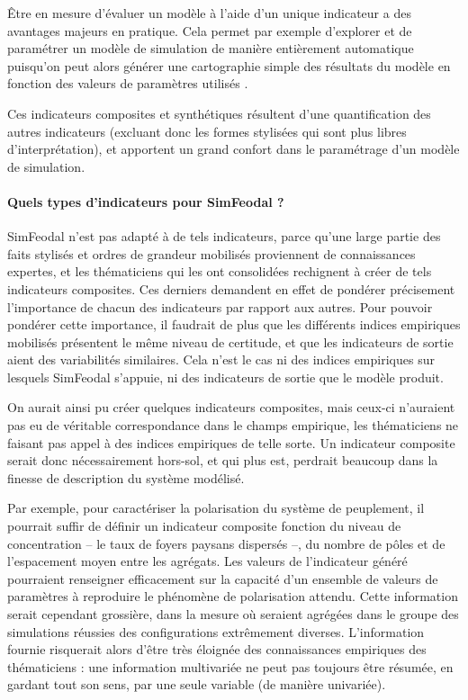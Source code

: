 Être en mesure d'évaluer un modèle à l'aide d'un unique indicateur a des avantages majeurs en pratique.
Cela permet par exemple d'explorer et de paramétrer un modèle de simulation de manière entièrement automatique puisqu'on peut alors générer une cartographie simple des résultats du modèle en fonction des valeurs de paramètres utilisés \autocite[voir][par exemple]{cherel_beyond_2015}.

Ces indicateurs composites et synthétiques résultent d'une quantification des autres indicateurs (excluant donc les formes stylisées qui sont plus libres d'interprétation), et apportent un grand confort dans le paramétrage d'un modèle de simulation.

\paragraph{Quels types d'indicateurs pour SimFeodal ?}\label{par:indicateurs-simfeodal}

SimFeodal n'est pas adapté à de tels indicateurs, parce qu'une large partie des faits stylisés et ordres de grandeur mobilisés proviennent de connaissances expertes, et les thématiciens qui les ont consolidées rechignent à créer de tels indicateurs composites.
Ces derniers demandent en effet de pondérer précisement l'importance de chacun des indicateurs par rapport aux autres.
Pour pouvoir pondérer cette importance, il faudrait de plus que les différents indices empiriques mobilisés présentent le même niveau de certitude, et que les indicateurs de sortie aient des variabilités similaires.
Cela n'est le cas ni des indices empiriques sur lesquels SimFeodal s'appuie, ni des indicateurs de sortie que le modèle produit.

On aurait ainsi pu créer quelques indicateurs composites, mais ceux-ci n'auraient pas eu de véritable correspondance dans le champs empirique, les thématiciens ne faisant pas appel à des indices empiriques de telle sorte.
Un indicateur composite serait donc nécessairement \og hors-sol\fg{}, et qui plus est, perdrait beaucoup dans la finesse de description du système modélisé.

Par exemple, pour caractériser la polarisation du système de peuplement, il pourrait suffir de définir un indicateur composite fonction du niveau de concentration -- le taux de foyers paysans dispersés --, du nombre de pôles et de l'espacement moyen entre les agrégats.
Les valeurs de l'indicateur généré pourraient renseigner efficacement sur la capacité d'un ensemble de valeurs de paramètres à reproduire le phénomène de polarisation attendu.
Cette information serait cependant grossière, dans la mesure où seraient agrégées dans le groupe des \og simulations réussies\fg{} des configurations extrêmement diverses.
L'information fournie risquerait alors d'être très éloignée des connaissances empiriques des thématiciens :
une information multivariée ne peut pas toujours être résumée, en gardant tout son sens, par une seule variable (de manière univariée).

